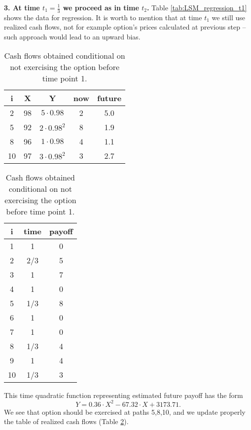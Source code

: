 \documentclass[a4paper,11pt, twoside]{book}
\theoremstyle{definition}
\theoremstyle{remark}
\newcounter{example}[chapter]
\begin{document}
\noindent \textbf{3. At time $t_1 = \frac{1}{3}$ we proceed as in time $t_2$.}
Table \ref{tab:LSM_regression_t1} shows the data for regression. It is worth to mention that at time $t_1$ we still use realized cash flows, not for example option's prices calculated at previous step -- such approach would lead to an upward bias.
\begin{table}[!ht]
\parbox{.45\linewidth} {
  \centering
  \caption{Estimating future payoffs at time point 1.}
  \label{tab:LSM_regression_t1}
  \begin{tabular} {||c |c |c || c | c ||}  
  \hline 
    i & X   &  Y  & now   &  future\\ \hline \hline
    2 & 98 & $5\cdot 0.98$ & 2 & 5.0 \\ \hline
    5 & 92 & $2\cdot 0.98^2$ & 8 & 1.9  \\ \hline
    8 & 96 & $1\cdot 0.98$ & 4 & 1.1 \\ \hline
  10 & 97 & $3\cdot 0.98^2$ & 3 & 2.7 \\ \hline
  \end{tabular}
}
\qquad
\parbox{.45\linewidth} {
  \centering
  \caption{Cash flows obtained conditional on not exercising the option before time point 1.}
  \label{tab:LSM_cashflows_t1}
  \begin{tabular}{|| c | c | c ||}
  \hline 
  i  & time  &  payoff \\ \hline \hline
  1  & 1     &      0 \\ \hline
  2  & 2/3   &      5 \\ \hline
  3  & 1     &      7 \\ \hline
  4  & 1     &      0 \\ \hline
  5  & 1/3   &      8 \\ \hline
  6  & 1     &      0 \\ \hline
  7  & 1     &      0 \\ \hline
  8  & 1/3   &      4 \\ \hline
  9  & 1     &      4 \\ \hline
  10  & 1/3   &      3 \\ \hline
  \end{tabular}
}
\end{table}

This time quadratic function representing estimated future payoff has the form
\[ Y = 0.36\cdot X^2 - 67.32\cdot X + 3173.71. \]
We see that option should be exercised at paths 5,8,10, and we update properly the table of realized cash flows (Table \ref{tab:LSM_cashflows_t1}).
\end{document}

